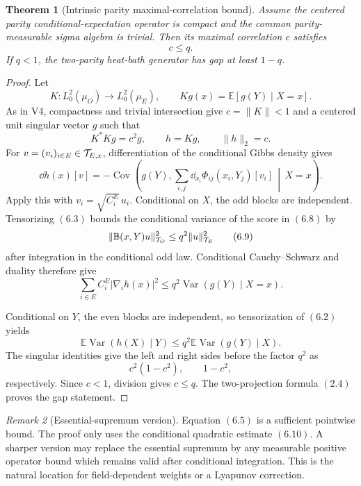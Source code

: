 \documentclass[11pt]{article}
\newtheorem{theorem}{Theorem}[section]
\theoremstyle{remark}
\newtheorem{remark}[theorem]{Remark}
\begin{document}
\begin{theorem}[Intrinsic parity maximal-correlation bound]
\label{thm:v15v6-intrinsic-correlation}
Assume the centered parity conditional-expectation operator is
compact and the common parity-measurable sigma algebra is trivial.
Then its maximal correlation \(c\) satisfies
\[
 \boxed{c\le q.}                                             \tag{6.6}
\]
If \(q<1\), the two-parity heat-bath generator has gap at least
\(1-q\).
\end{theorem}

\begin{proof}
Let
\[
 K:L^2_0(\mu_O)\to L^2_0(\mu_E),
 \qquad Kg(x)=\mathbb E[g(Y)\mid X=x].
\]
As in V4, compactness and trivial intersection give \(c=\|K\|<1\)
and a centered unit singular vector \(g\) such that
\[
 K^*Kg=c^2g,\qquad h=Kg,\qquad\|h\|_2=c.                    \tag{6.7}
\]
For \(v=(v_i)_{i\in E}\in{\cal T}_{E,x}\), differentiation of the
conditional Gibbs density gives
\[
 \dd h(x)[v]
 =-\operatorname{Cov}\left(
 g(Y),
 \sum_{i,j}\dd_{x_i}\Phi_{ij}(x_i,Y_j)[v_i]
 \,\middle|\,X=x\right).                                    \tag{6.8}
\]
Apply this with \(v_i=\sqrt{C_i^E}\,u_i\).  Conditional on \(X\),
the odd blocks are independent.  Tensorizing \((6.3)\) bounds the
conditional variance of the score in \((6.8)\) by
\[
 \|{\mathbb B}(x,Y)u\|_{{\cal T}_O}^2
 \le q^2\|u\|_{{\cal T}_E}^2                                \tag{6.9}
\]
after integration in the conditional odd law.  Conditional
Cauchy--Schwarz and duality therefore give
\[
 \sum_{i\in E}C_i^E|\nabla_ih(x)|^2
 \le q^2\operatorname{Var}(g(Y)\mid X=x).                    \tag{6.10}
\]

Conditional on \(Y\), the even blocks are independent, so
tensorization of \((6.2)\) yields
\[
 \mathbb E\operatorname{Var}(h(X)\mid Y)
 \le q^2\mathbb E\operatorname{Var}(g(Y)\mid X).             \tag{6.11}
\]
The singular identities give the left and right sides before the
factor \(q^2\) as
\[
 c^2(1-c^2),\qquad 1-c^2,
\]
respectively.  Since \(c<1\), division gives \(c\le q\).  The
two-projection formula \((2.4)\) proves the gap statement.
\end{proof}

\begin{remark}[Essential-supremum version]
\label{rem:v15v6-average}
Equation \((6.5)\) is a sufficient pointwise bound.  The proof only
uses the conditional quadratic estimate \((6.10)\).  A sharper
version may replace the essential supremum by any measurable
positive operator bound which remains valid after conditional
integration.  This is the natural location for field-dependent
weights or a Lyapunov correction.
\end{remark}
\end{document}
